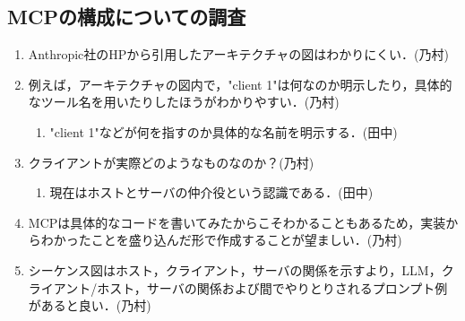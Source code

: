 \documentclass[dvipdfmx]{jsarticle}
\begin{document}
\subsection{MCPの構成についての調査}
\begin{enumerate}
    \item Anthropic社のHPから引用したアーキテクチャの図はわかりにくい．\hfill{(乃村)}\\
    \item 例えば，アーキテクチャの図内で，"client 1"は何なのか明示したり，具体的なツール名を用いたりしたほうがわかりやすい．\hfill{(乃村)}
    \begin{enumerate}
        \item "client 1"などが何を指すのか具体的な名前を明示する．\hfill{(田中)}\\
    \end{enumerate}
    \item クライアントが実際どのようなものなのか？\hfill{(乃村)}
    \begin{enumerate}
        \item 現在はホストとサーバの仲介役という認識である．\hfill{(田中)}\\
    \end{enumerate}
    \item MCPは具体的なコードを書いてみたからこそわかることもあるため，実装からわかったことを盛り込んだ形で作成することが望ましい．\hfill{(乃村)}\\
    \item シーケンス図はホスト，クライアント，サーバの関係を示すより，LLM，クライアント/ホスト，サーバの関係および間でやりとりされるプロンプト例があると良い．\hfill{(乃村)}\\
\end{enumerate}
\end{document}
